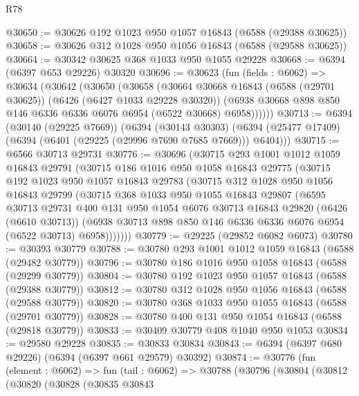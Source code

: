 \begin{lexlean}{R78}
\begin{coremodule}
@30650 := @30626 @192 @1023 @950 @1057 @16843 (@6588 (@29388 @30625))
@30658 := @30626 @312 @1028 @950 @1056 @16843 (@6588 (@29588 @30625))
@30664 := @30342 @30625 @368 @1033 @950 @1055 @29228
@30668 := @6394 (@6397 @653 @29226) @30320
@30696 := @30623
    (fun (fields : @6062) =>
    @30634
      (@30642
        (@30650
          (@30658
            (@30664
              @30668
              @16843
              (@6588 (@29701 @30625))
              (@6426 (@6427 @1033 @29228 @30320))
              (@6938 @30668 @898 @850 @146 @6336 @6336 @6076 @6954 (@6522 @30668) @6958))))))
@30713 := @6394
    (@30140 (@29225 @7669))
    (@6394
      (@30143 @30303)
      (@6394 (@25477 @17409) (@6394 (@6401 (@29225 (@29996 @7690 @7685 @7669))) @6404)))
@30715 := @6566 @30713 @29731
@30776 := @30696
    (@30715
      @293
      @1001
      @1012
      @1059
      @16843
      @29791
      (@30715
        @186
        @1016
        @950
        @1058
        @16843
        @29775
        (@30715
          @192
          @1023
          @950
          @1057
          @16843
          @29783
          (@30715
            @312
            @1028
            @950
            @1056
            @16843
            @29799
            (@30715
              @368
              @1033
              @950
              @1055
              @16843
              @29807
              (@6595
                @30713
                @29731
                @400
                @131
                @950
                @1054
                @6076
                @30713
                @16843
                @29820
                (@6426 (@6610 @30713))
                (@6938 @30713 @898 @850 @146 @6336 @6336 @6076 @6954 (@6522 @30713) @6958)))))))
@30779 := @29225 (@29852 @6082 @6073)
@30780 := @30393 @30779
@30788 := @30780 @293 @1001 @1012 @1059 @16843 (@6588 (@29482 @30779))
@30796 := @30780 @186 @1016 @950 @1058 @16843 (@6588 (@29299 @30779))
@30804 := @30780 @192 @1023 @950 @1057 @16843 (@6588 (@29388 @30779))
@30812 := @30780 @312 @1028 @950 @1056 @16843 (@6588 (@29588 @30779))
@30820 := @30780 @368 @1033 @950 @1055 @16843 (@6588 (@29701 @30779))
@30828 := @30780 @400 @131 @950 @1054 @16843 (@6588 (@29818 @30779))
@30833 := @30409 @30779 @408 @1040 @950 @1053
@30834 := @29580 @29228
@30835 := @30833 @30834
@30843 := @6394 (@6397 @680 @29226) (@6394 (@6397 @661 @29579) @30392)
@30874 := @30776
    (fun (element : @6062) =>
    fun (tail : @6062) =>
    @30788
      (@30796
        (@30804
          (@30812
            (@30820
              (@30828
                (@30835
                  @30843

\end{coremodule}
\end{lexlean}
